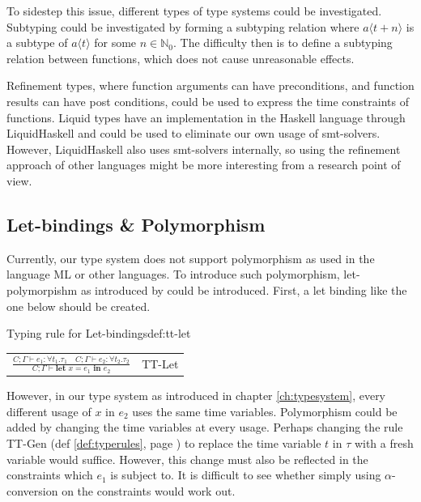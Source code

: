 To sidestep this issue, different types of type systems could be investigated.
Subtyping could be investigated by forming a subtyping relation where $a\langle t + n\rangle$ is a subtype of $a\langle t \rangle$ for some $n \in \mathbb{N}_0$.
The difficulty then is to define a subtyping relation between functions, which does not cause unreasonable effects.

Refinement types\cite{freeman1991refinement}, where function arguments can have preconditions, and function results can have post conditions, could be used to express the time constraints of functions.
Liquid types\cite{rondon2008liquid} have an implementation in the Haskell language through LiquidHaskell\cite{liquidhaskell} and could be used to eliminate our own usage of \gls{smt}-solvers.
However, LiquidHaskell also uses \gls{smt}-solvers internally, so using the refinement approach of other languages might be more interesting from a research point of view.

\subsection{Let-bindings \& Polymorphism}
Currently, our type system does not support polymorphism as used in the language ML\cite{milner1978theory} or other languages.
To introduce such polymorphism, let-polymorpishm as introduced by \citeauthor{milner1978theory} could be introduced.
First, a let binding like the one below should be created.

\begin{definitiontitled}{Typing rule for Let-bindings}{def:tt-let}
\centering
\begin{tabular}{l l}
$ \displaystyle
\frac{ C;\Gamma \vdash e_1 : \forall t_1. \tau_1 \quad C;\Gamma \vdash e_2 : \forall t_2. \tau_2
} { C;\Gamma \vdash \textbf{let } x = e_1 \textbf{ in } e_2 }
$ &
TT-Let\\
\end{tabular}
\end{definitiontitled}

However, in our type system as introduced in chapter \ref{ch:typesystem}, every different usage of $x$ in $e_2$ uses the same time variables.
Polymorphism could be added by changing the time variables at every usage.
Perhaps changing the rule TT-Gen (def \ref{def:typerules}, page \pageref{def:typerules}) to replace the time variable $t$ in $\tau$ with a fresh variable would suffice.
However, this change must also be reflected in the constraints which $e_1$ is subject to. 
It is difficult to see whether simply using $\alpha$-conversion on the constraints would work out.

